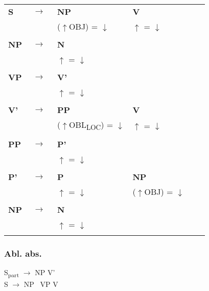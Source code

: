 \documentclass[12pt,a4paper]{article}
\begin{document}
\begin{tabular}{ l  l  l  l  l  l }
  \textbf{S} & $\rightarrow$ & \: \: \textbf{NP} & \: \textbf{V}\\
   & $\qquad$ & ($\uparrow$OBJ) = $\downarrow$ & $\uparrow$ = $\downarrow$ \\
   $\qquad$ & $\qquad$ \\
    \textbf{NP} & $\rightarrow$ & \: \textbf{N} \\
   & $\qquad$ & $\uparrow$ = $\downarrow$\\
      $\qquad$ & $\qquad$ \\
    \textbf{VP} & $\rightarrow$ & \: \textbf{V'} \\
   & $\qquad$ & $\uparrow$ = $\downarrow$\\
   $\qquad$ & $\qquad$ \\
    \textbf{V'} & $\rightarrow$ & \: \: \textbf{PP} & \: \: \textbf{V} & \\
   & $\qquad$ &($\uparrow$OBL\textsubscript{LOC}) = $\downarrow$  & \: $\uparrow$ = $\downarrow$\\
   $\qquad$ & $\qquad$ \\
    \textbf{PP} & $\rightarrow$ & \: \textbf{P'} \\
	& $\qquad$   & $\uparrow$ = $\downarrow$\\
   $\qquad$ & $\qquad$ \\
    \textbf{P'} & $\rightarrow$ & \: \textbf{P} & \: \: \textbf{NP} \\
   & $\qquad$ & $\uparrow$ = $\downarrow$ & ($\uparrow$OBJ) = $\downarrow$ \\
   $\qquad$ & $\qquad$ \\
    \textbf{NP} & $\rightarrow$ & \: \textbf{N} \\
   & $\qquad$ & $\uparrow$ = $\downarrow$\\
      $\qquad$ & $\qquad$ \\     
\end{tabular} 

\subsubsection{Abl. abs.}

S\textsubscript{part} $\rightarrow$ NP \: V'\\

S $\rightarrow$ NP \, VP \: V\\
\end{document}
